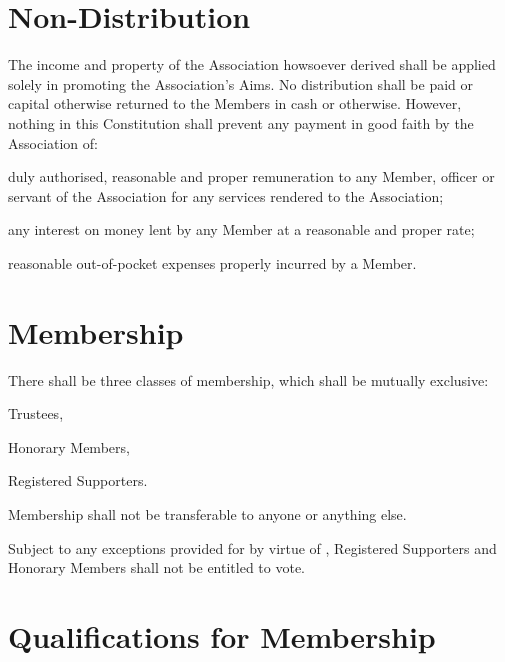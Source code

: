 \documentclass[10pt]{mk-articles-of-association}
\begin{document}


\section{Non-Distribution}

  The income and property of the Association howsoever derived shall be
  applied solely in promoting the Association’s Aims. No distribution shall
  be paid or capital otherwise returned to the Members in cash or otherwise.
  However, nothing in this Constitution shall prevent any payment in good
  faith by the Association of:
  \begin{constenum}
  \item duly authorised, reasonable and proper remuneration to any Member,
    officer or servant of the Association for any services rendered to the
    Association;
  \item any interest on money lent by any Member at a reasonable and proper
    rate; \ITor
  \item reasonable out-of-pocket expenses properly incurred by a Member.
  \end{constenum}




\section{Membership}
  \begin{constenum}

  \item There shall be three classes of membership, which shall be mutually
    exclusive:
    \begin{constenum}
      \item Trustees,
      \item Honorary Members, \ITand
      \item Registered Supporters.
    \end{constenum}

  \item Membership shall not be transferable to anyone or anything else.

  \item Subject to any exceptions provided for by virtue of
    ,
    Registered Supporters and
    Honorary Members shall not be entitled to vote.

\end{constenum}



\section{Qualifications for Membership}
\end{document}
